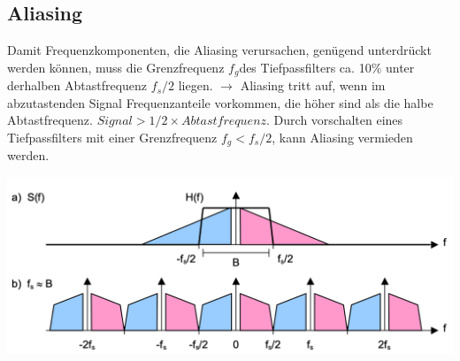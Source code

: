 \subsection{Aliasing}
Damit Frequenzkomponenten, die Aliasing verursachen, genügend unterdrückt werden können, muss die Grenzfrequenz $f_g$des Tiefpassfilters ca. 10\% unter derhalben Abtastfrequenz $f_s/ 2$ liegen.
$\rightarrow$ Aliasing tritt auf, wenn im abzutastenden Signal Frequenzanteile vorkommen, die höher sind als die halbe Abtastfrequenz. $Signal > 1/2 \times Abtastfrequenz$. Durch vorschalten eines Tiefpassfilters mit einer Grenzfrequenz $f_g < f_s / 2$, kann Aliasing vermieden werden.
\vspace{-8pt}
\begin{center}
    \includegraphics[width=\linewidth]{graphic/sprache-digitalisieren/Aliasing.png}
\end{center}
\vspace{-8pt}

